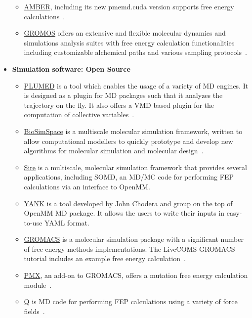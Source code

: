\documentclass[9pt,bestpractices]{livecoms}
\begin{document}
\begin{itemize}
\begin{itemize}
	\item \href{https://ambermd.org/}{AMBER}, including its new pmemd.cuda version supports free energy calculations~\cite{salomon-ferrer2013overview}. 
	\item \href{http://www.gromos.net/}{GROMOS} offers an extensive and flexible molecular dynamics and simulations analysis suites with free energy calculation functionalities including customizable alchemical paths and various sampling protocols~\cite{schmid2012architecture, kunz2012new, eichenberger2011gromos}.
	\end{itemize}
\item [] \textbf{Simulation software: Open Source}
	\begin{itemize}
	\item \href{https://www.plumed.org/}{PLUMED} is a tool which enables the usage of a variety of MD engines. It is designed as a plugin for MD packages such that it analyzes the trajectory on the fly. It also offers a VMD based plugin for the computation of collective variables~\cite{bonomi2019promoting}.   	
	\item \href{https://biosimspace.org/}{BioSimSpace} is a multiscale molecular simulation framework, written to allow computational modellers to quickly prototype and develop new algorithms for molecular simulation and molecular design~\cite{hedges2019biosimspace}. 
	\item \href{https://siremol.org/}{Sire} is a multiscale, molecular simulation framework that provides several applications, including SOMD, an MD/MC code for performing FEP calculations via an interface to OpenMM. 
	\item \href{http://getyank.org/latest/index.html}{YANK} is a tool developed by John Chodera and group on the top of OpenMM MD package. It allows the users to write their inputs in easy-to-use YAML format.
	\item \href{http://www.gromacs.org/}{GROMACS} is a molecular simulation package with a significant number of free energy methods implementations. The LiveCOMS GROMACS tutorial includes an example free energy calculation~\cite{lemkul2018From}.
	\item \href{http://pmx.mpibpc.mpg.de/instructions.html}{PMX}, an add-on to GROMACS, offers a mutation free energy calculation module~\cite{abraham2015gromacs}.
	\item \href{https://github.com/qusers/Q6}{Q} is MD code for performing FEP calculations using a variety of force fields~\cite{aaquist2017q6}. 
	\end{itemize}

\end{itemize}
\end{document}
